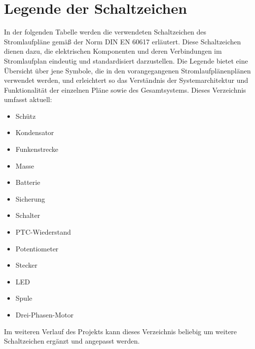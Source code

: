 \section*{Legende der Schaltzeichen}
In der folgenden Tabelle werden die verwendeten Schaltzeichen des Stromlaufpläne gemäß der Norm DIN EN 60617 erläutert. Diese Schaltzeichen dienen dazu, die elektrischen Komponenten und deren Verbindungen im Stromlaufplan eindeutig und standardisiert darzustellen. Die Legende bietet eine Übersicht über jene Symbole, die in den vorangegangenen Stromlaufplänenplänen verwendet werden, und erleichtert so das Verständnis der Systemarchitektur und Funktionalität der einzelnen Pläne sowie des Gesamtsystems. Dieses Verzeichnis umfasst aktuell:

\begin{multicols}{2}
	\begin{itemize}
		\item Schütz
		\item Kondensator
		\item Funkenstrecke
		\item Masse
		\item Batterie
		\item Sicherung
		\item Schalter
	\end{itemize}
	\columnbreak
	\begin{itemize}
		\item PTC-Wiederstand
		\item Potentiometer
		\item Stecker
		\item LED
		\item Spule
		\item Drei-Phasen-Motor
	\end{itemize}
\end{multicols}

Im weiteren Verlauf des Projekts kann dieses Verzeichnis beliebig um weitere Schaltzeichen ergänzt und angepasst werden.

